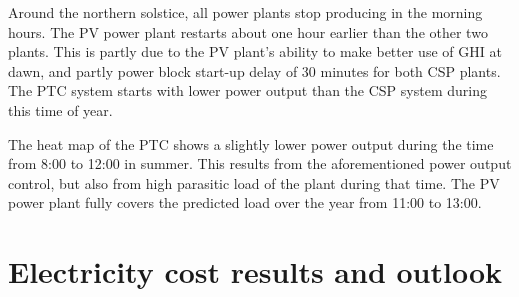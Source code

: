 
Around the northern solstice, all power plants stop producing in the morning hours. The \ac{PV} power plant restarts about one hour earlier than the other two plants. This is partly due to the \ac{PV} plant's ability to make better use of \ac{GHI} at dawn, and partly power block start-up delay of 30 minutes for both \ac{CSP} plants. The \ac{PTC} system starts with lower power output than the \ac{CSP} system during this time of year.


The heat map of the \ac{PTC} shows a slightly lower power output during the time from 8:00 to 12:00 in summer. This results from the aforementioned power output control, but also from high parasitic load of the plant during that time. The PV power plant fully covers the predicted load over the year from 11:00 to 13:00.
\pagebreak
\section{Electricity cost results and outlook}


